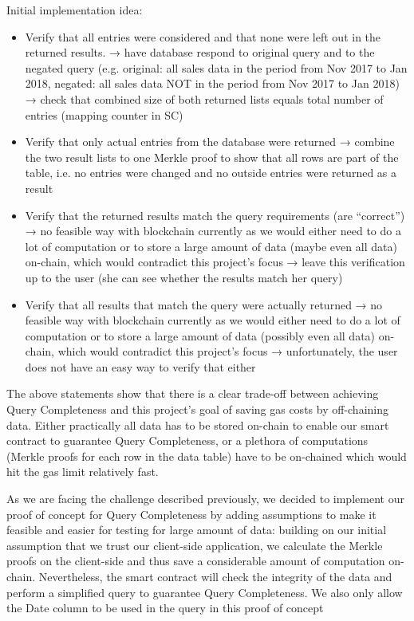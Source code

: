 Initial implementation idea:
\begin{itemize}
\item Verify that all entries were considered and that none were left out in the returned results.
→  have database respond to original query and to the negated query (e.g. original: all sales data in the period from Nov 2017 to Jan 2018, negated: all sales data NOT in the period from Nov 2017 to Jan 2018)
→ check that combined size of both returned lists equals total number of entries (mapping counter in SC)
\item Verify that only actual entries from the database were returned
→ combine the two result lists to one Merkle proof to show that all rows are part of the table, i.e. no entries were changed and no outside entries were returned as a result
\item Verify that the returned results match the query requirements (are “correct”)
→ no feasible way with blockchain currently as we would either need to do a lot of computation or to store a large amount of data (maybe even all data) on-chain, which would contradict this project’s focus
→ leave this verification up to the user (she can see whether the results match her query)
\item Verify that all results that match the query were actually returned
→ no feasible way with blockchain currently as we would either need to do a lot of computation or to store a large amount of data (possibly even all data) on-chain, which would contradict this project’s focus
→ unfortunately, the user does not have an easy way to verify that either
\end{itemize}

The above statements show that there is a clear trade-off between achieving Query Completeness and this project’s goal of saving gas costs by off-chaining data. Either practically all data has to be stored on-chain to enable our smart contract to guarantee Query Completeness, or a plethora of computations (Merkle proofs for each row in the data table) have to be on-chained which would hit the gas limit relatively fast. 

As we are facing the challenge described previously, we decided to implement our proof of concept for Query Completeness by adding assumptions to make it feasible and easier for testing for large amount of data: building on our initial assumption that we trust our client-side application, we calculate the Merkle proofs on the client-side and thus save a considerable amount of computation on-chain. Nevertheless, the smart contract will check the integrity of the data and perform a simplified query to guarantee Query Completeness. We also only allow the Date column to be used in the query in this proof of concept

